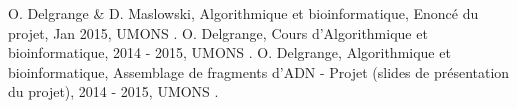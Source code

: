\documentclass[12pt,a4paper,final]{article}
\begin{document}
\newpage
%
%
\begin{thebibliography}{9}
    O. Delgrange \& D. Maslowski,
    Algorithmique et bioinformatique, Enoncé du projet,
    Jan 2015,
    UMONS
		.
    O. Delgrange,
    Cours d'Algorithmique et bioinformatique,
    2014 - 2015,
    UMONS
		.
    O. Delgrange,
    Algorithmique et bioinformatique, Assemblage de fragments d’ADN - Projet (slides de présentation du projet),
    2014 - 2015,
    UMONS
		.
\end{thebibliography}
\end{document}
